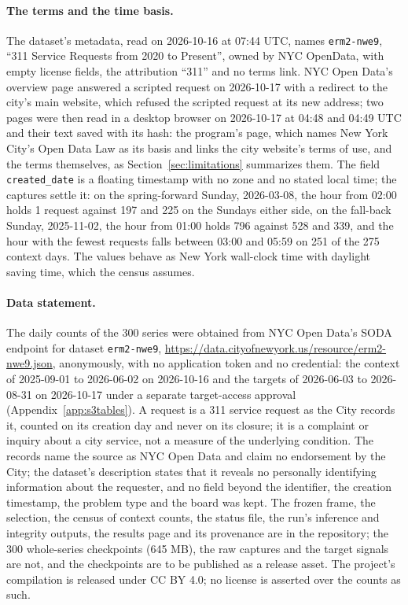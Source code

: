 \paragraph{The terms and the time basis.} The dataset's metadata, read on 2026-10-16 at 07:44 UTC, names
\texttt{erm2-nwe9}, ``311 Service Requests from 2020 to Present'', owned by NYC OpenData, with empty license
fields, the attribution ``311'' and no terms link. NYC Open Data's overview page answered a scripted request
on 2026-10-17 with a redirect to the city's main website, which refused the scripted request at its new
address; two pages were then read in a desktop browser on 2026-10-17 at 04:48 and 04:49 UTC and their text
saved with its hash: the program's page, which names New York City's Open Data Law as its basis and links the
city website's terms of use, and the terms themselves, as Section~\ref{sec:limitations} summarizes them. The
field \texttt{created\_date} is a floating timestamp with no zone and no stated local time; the captures
settle it: on the spring-forward Sunday, 2026-03-08, the hour from 02:00 holds 1 request against 197 and 225
on the Sundays either side, on the fall-back Sunday, 2025-11-02, the hour from 01:00 holds 796 against 528
and 339, and the hour with the fewest requests falls between 03:00 and 05:59 on 251 of the 275 context days.
The values behave as New York wall-clock time with daylight saving time, which the census assumes.

\paragraph{Data statement.} The daily counts of the 300 series were obtained from NYC Open Data's SODA
endpoint for dataset \texttt{erm2-nwe9}, \url{https://data.cityofnewyork.us/resource/erm2-nwe9.json},
anonymously, with no application token and no credential: the context of 2025-09-01 to 2026-06-02 on
2026-10-16 and the targets of 2026-06-03 to 2026-08-31 on 2026-10-17 under a separate target-access
approval (Appendix~\ref{app:s3tables}). A request is a 311 service request as the City records it, counted
on its creation day and never on its closure; it is a complaint or inquiry about a city service, not a
measure of the underlying condition. The records name the source as NYC Open Data and claim no endorsement
by the City; the dataset's description states that it reveals no personally identifying information about
the requester, and no field beyond the identifier, the creation timestamp, the problem type and the board
was kept. The frozen frame, the selection, the census of context counts, the status file, the run's
inference and integrity outputs, the results page and its provenance are in the repository; the 300
whole-series checkpoints (645 MB), the raw captures and the target signals are not, and the checkpoints are
to be published as a release asset. The project's compilation is released under CC BY 4.0; no license is
asserted over the counts as such.
